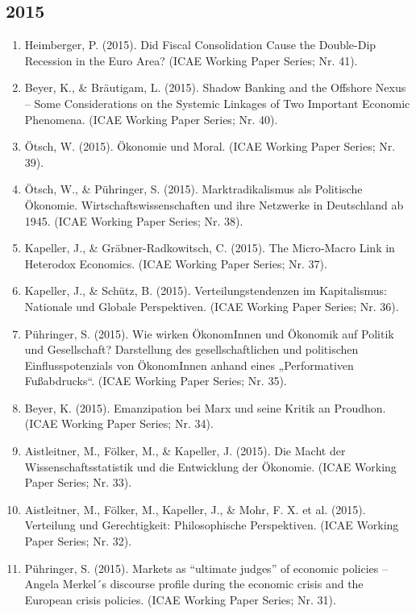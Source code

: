 \subsection*{2015}
\begin{enumerate}
	 \item Heimberger, P. (2015). Did Fiscal Consolidation Cause the Double-Dip Recession in the Euro Area? (ICAE Working Paper Series; Nr. 41).
	 \item Beyer, K., \& Bräutigam, L. (2015). Shadow Banking and the Offshore Nexus -- Some Considerations on the Systemic Linkages of Two Important Economic Phenomena. (ICAE Working Paper Series; Nr. 40).
	 \item Ötsch, W. (2015). Ökonomie und Moral. (ICAE Working Paper Series; Nr. 39).
	 \item Ötsch, W., \& Pühringer, S. (2015). Marktradikalismus als Politische Ökonomie. Wirtschaftswissenschaften und ihre Netzwerke in Deutschland ab 1945. (ICAE Working Paper Series; Nr. 38).
	 \item Kapeller, J., \& Gräbner-Radkowitsch, C. (2015). The Micro‐Macro Link in Heterodox Economics. (ICAE Working Paper Series; Nr. 37).
	 \item Kapeller, J., \& Schütz, B. (2015). Verteilungstendenzen im Kapitalismus: Nationale und Globale Perspektiven. (ICAE Working Paper Series; Nr. 36).
	 \item Pühringer, S. (2015). Wie wirken ÖkonomInnen und Ökonomik auf Politik und Gesellschaft? Darstellung des gesellschaftlichen und politischen Einflusspotenzials von ÖkonomInnen anhand eines „Performativen Fußabdrucks“. (ICAE Working Paper Series; Nr. 35).
	 \item Beyer, K. (2015). Emanzipation bei Marx und seine Kritik an Proudhon. (ICAE Working Paper Series; Nr. 34).
	 \item Aistleitner, M., Fölker, M., \& Kapeller, J. (2015). Die Macht der Wissenschaftsstatistik und die Entwicklung der Ökonomie. (ICAE Working Paper Series; Nr. 33).
	 \item Aistleitner, M., Fölker, M., Kapeller, J., \& Mohr, F. X. et al. (2015). Verteilung und Gerechtigkeit: Philosophische Perspektiven. (ICAE Working Paper Series; Nr. 32).
	 \item Pühringer, S. (2015). Markets as “ultimate judges” of economic policies -- Angela Merkel´s discourse profile during the economic crisis and the European crisis policies. (ICAE Working Paper Series; Nr. 31).
\end{enumerate}
